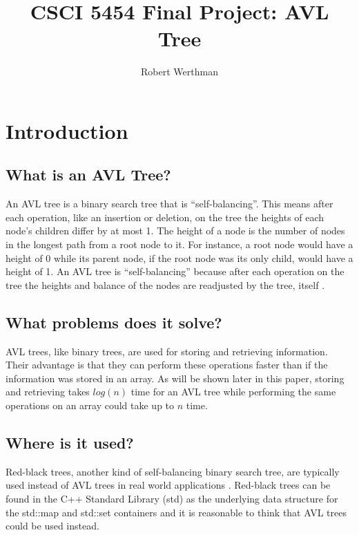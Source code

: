 \documentclass[12pt]{article}
\title{CSCI 5454 Final Project: AVL Tree}
\author{Robert Werthman}
\date{}
\begin{document}
\maketitle

\newpage
\tableofcontents

\newpage
{}
\section*{Introduction}

\subsection*{What is an AVL Tree?}

An AVL tree is a binary search tree that is ``self-balancing''.  This means
after each operation, like an insertion or deletion, on the tree the heights of 
each node's children differ by at most 1.  The height of a node is the number of
nodes in the longest path from a root node to it.  For instance, a root node
would have a height of 0 while its parent node, if the root node was its only child, would
have a height of 1.  An AVL tree is ``self-balancing'' because after each
operation on the tree the heights and balance of the nodes are readjusted by the tree,
itself \cite{wiki:avl}.

\subsection*{What problems does it solve?}
AVL trees, like binary trees, are used for storing and retrieving
information.  Their advantage is that they can perform these operations faster
than if the information was stored in an array.  As will be shown later in this
paper, storing and retrieving takes $log(n)$ time for an AVL tree
while performing the same operations on an array could take up to $n$ time.

\subsection*{Where is it used?}
Red-black trees, another kind of self-balancing binary search tree, are
typically used instead of AVL trees in real world applications
\cite{wiki:red-black}.
Red-black trees can be found in the C++ Standard Library (std) as the underlying data structure
for the std::map and std::set containers and it is reasonable to think that AVL
trees could be used instead.
\end{document}
